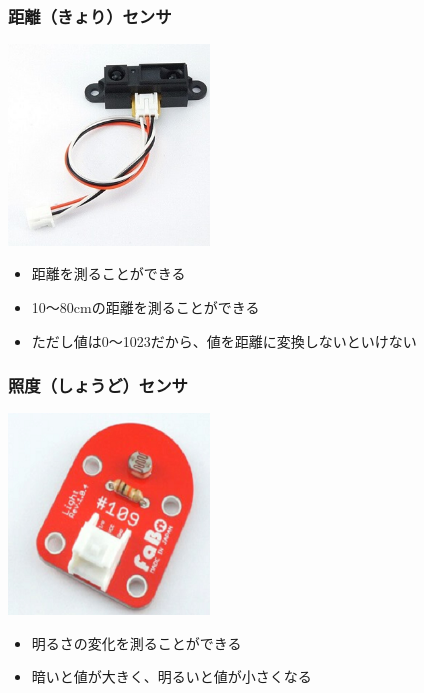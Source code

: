 \begin{frame}
    \frametitle{距離（きょり）センサ}
    \begin{center}
        \includegraphics[width=0.4\textwidth]{images/chap05/text05-img023.jpg}
        \begin{itemize}
            \item 距離を測ることができる
            \item 10〜80cmの距離を測ることができる
            \item ただし値は0〜1023だから、値を距離に変換しないといけない
        \end{itemize}
    \end{center}
\end{frame}

\begin{frame}
    \frametitle{照度（しょうど）センサ}
    \begin{center}
        \includegraphics[width=0.4\textwidth]{images/chap05/text05-img024.png}
        \begin{itemize}
            \item 明るさの変化を測ることができる
            \item 暗いと値が大きく、明るいと値が小さくなる
        \end{itemize}
    \end{center}
\end{frame}

